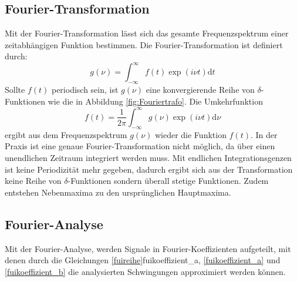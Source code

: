\subsection{Fourier-Transformation}
\label{sec:Fourier-Transformation}
Mit der Fourier-Transformation lässt sich das gesamte Frequenzspektrum einer
zeitabhängigen Funktion bestimmen. Die Fourier-Transformation ist definiert durch:
\begin{equation}
  g(\nu)= \int_{-\infty}^\infty f(t)\exp(i\nu t) \mathrm{d}t
\end{equation}
Sollte $f(t)$ periodisch sein, ist $g(\nu)$ eine konvergierende Reihe von
$\delta$-Funktionen wie die in Abbildung \ref{fig:Fouriertrafo}. Die Umkehrfunktion
\begin{equation}
  f(t)= \frac{1}{2\pi}\int_{-\infty}^\infty g(\nu)\exp(i\nu t) \mathrm{d}\nu
\end{equation}
ergibt aus dem Frequenzspektrum $g(\nu)$ wieder die Funktion $f(t)$. In der
Praxis ist eine genaue Fourier-Transformation nicht möglich, da über einen unendlichen
Zeitraum integriert werden muss. Mit endlichen Integrationsgenzen ist keine
Periodizität mehr gegeben, dadurch ergibt sich aus der Transformation keine Reihe
von $\delta$-Funktionen sondern überall stetige Funktionen. Zudem entstehen
Nebenmaxima zu den ursprünglichen Hauptmaxima.
\subsection{Fourier-Analyse}
\label{sec:Fourier-Analyse}
Mit der Fourier-Analyse, werden Signale in Fourier-Koeffizienten aufgeteilt, mit
denen durch die Gleichungen \eqref{fuireihe}{fuikoeffizient_a}, \eqref{fuikoeffizient_a}
und \eqref{fuikoeffizient_b} die analysierten Schwingungen approximiert werden können.

\cite{sample}
